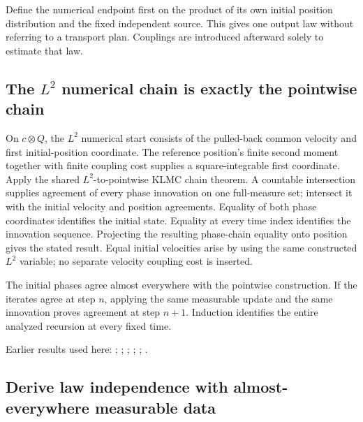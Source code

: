 \documentclass[11pt,a4paper]{report}
\begin{document}
Define the numerical endpoint first on the product of its own initial position distribution and the fixed independent source. This gives one output law without referring to a transport plan. Couplings are introduced afterward solely to estimate that law.

\subsection{\texorpdfstring{The \(L^{2}\) numerical chain is exactly the pointwise chain}{The L² numerical chain is exactly the pointwise chain}}
\label{report-step-KineticLangevin-ProductLaw-lean-4}


On \(c\otimes Q\), the \(L^{2}\) numerical start consists of the pulled-back common velocity and first initial-position coordinate. The reference position's finite second moment together with finite coupling cost supplies a square-integrable first coordinate. Apply the shared \(L^{2}\)-to-pointwise KLMC chain theorem. A countable intersection supplies agreement of every phase innovation on one full-measure set; intersect it with the initial velocity and position agreements. Equality of both phase coordinates identifies the initial state. Equality at every time index identifies the innovation sequence. Projecting the resulting phase-chain equality onto position gives the stated result. Equal initial velocities arise by using the same constructed \(L^{2}\) variable; no separate velocity coupling cost is inserted.



The initial phases agree almost everywhere with the pointwise construction. If the iterates agree at step \(n\), applying the same measurable update and the same innovation proves agreement at step \(n+1\). Induction identifies the entire analyzed recursion at every fixed time.



Earlier results used here: \cite[Section~3.13.2]{LangevinLean2026ULASC}; \cite[Section~3.17.1]{LangevinLean2026ULASC}; \cite[Section~3.17.2]{LangevinLean2026ULASC}; \cite[Section~3.22.18]{LangevinLean2026ULASC}; \cite[Section~3.22.19]{LangevinLean2026ULASC}; \cite[Section~3.22.2]{LangevinLean2026ULASC}.
\subsection{\texorpdfstring{Derive law independence with almost-everywhere measurable data}{Derive law independence with almost-everywhere measurable data}}
\label{report-step-KineticLangevin-ProductLaw-lean-5}
\end{document}

